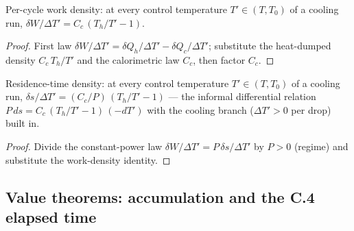 \begin{lemma}
\label{lem:IPhO2026Problems_problem_IPhO_2026_3_C_4:workDensity_eq}
Per-cycle work density: at every control temperature
$T' \in (T, T_0)$ of a cooling run,
$\delta W/\Delta T' = C_c\,(T_h/T' - 1)$.
\end{lemma}
\begin{proof}
First law
$\delta W/\Delta T' = \delta Q_h/\Delta T' - \delta Q_c/\Delta T'$;
substitute the heat-dumped density $C_c\,T_h/T'$ and the calorimetric
law $C_c$, then factor $C_c$.
\end{proof}

\begin{lemma}
\label{lem:IPhO2026Problems_problem_IPhO_2026_3_C_4:residenceDensity_eq}
Residence-time density: at every control temperature
$T' \in (T, T_0)$ of a cooling run,
$\delta s/\Delta T' = (C_c/P)\,(T_h/T' - 1)$ --- the informal
differential relation $P\,ds = C_c\,(T_h/T' - 1)\,(-dT')$ with the
cooling branch ($\Delta T' > 0$ per drop) built in.
\end{lemma}
\begin{proof}
Divide the constant-power law
$\delta W/\Delta T' = P\,\delta s/\Delta T'$ by $P > 0$ (regime) and
substitute the work-density identity.
\end{proof}

\subsection*{Value theorems: accumulation and the C.4 elapsed time}

